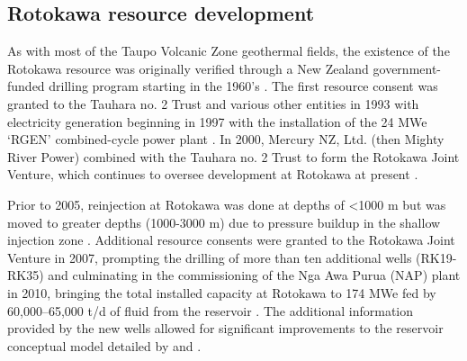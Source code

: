 \subsection{Rotokawa resource development}
As with most of the Taupo Volcanic Zone geothermal fields, the existence of the Rotokawa resource was originally verified through a New Zealand government-funded drilling program starting in the 1960's \citep{cole1998rotokawa}. The first resource consent was granted to the Tauhara no. 2 Trust and various other entities in 1993 with electricity generation beginning in 1997 with the installation of the 24 MWe `RGEN' combined-cycle power plant \citep{legmann200330}. In 2000, Mercury NZ, Ltd. (then Mighty River Power) combined with the Tauhara no. 2 Trust to form the Rotokawa Joint Venture, which continues to oversee development at Rotokawa at present \citep{legmann200330}.

Prior to 2005, reinjection at Rotokawa was done at depths of \textless1000 m \citep{Sewell_2015} but was moved to greater depths (1000-3000 m) due to pressure buildup in the shallow injection zone \citep{McNamara_2016}. Additional resource consents were granted to the Rotokawa Joint Venture in 2007, prompting the drilling of more than ten additional wells (RK19-RK35) and culminating in the commissioning of the Nga Awa Purua (NAP) plant in 2010, bringing the total installed capacity at Rotokawa to 174 MWe fed by 60,000--65,000 t/d of fluid from the reservoir \citep{McNamara_2016}. The additional information provided by the new wells allowed for significant improvements to the reservoir conceptual model detailed by \citet{Sewell_2015} and \citet{McNamara_2016}.

